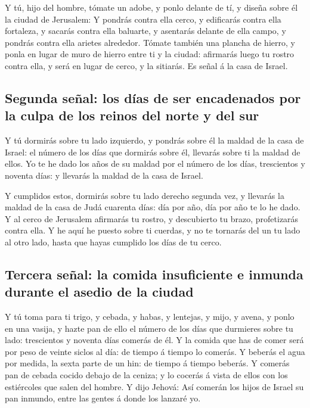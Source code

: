  Y tú, hijo del hombre, tómate un adobe, y ponlo delante de
tí, y diseña sobre él la ciudad de Jerusalem:  Y pondrás
contra ella cerco, y edificarás contra ella fortaleza, y sacarás contra
ella baluarte, y asentarás delante de ella campo, y pondrás contra ella
arietes alrededor.  Tómate también una plancha de hierro, y
ponla en lugar de muro de hierro entre ti y la ciudad: afirmarás luego
tu rostro contra ella, y será en lugar de cerco, y la sitiarás. Es señal
á la casa de Israel.

\hypertarget{segunda-seuxf1al-los-duxedas-de-ser-encadenados-por-la-culpa-de-los-reinos-del-norte-y-del-sur}{%
\subsection{Segunda señal: los días de ser encadenados por la culpa de
los reinos del norte y del
sur}\label{segunda-seuxf1al-los-duxedas-de-ser-encadenados-por-la-culpa-de-los-reinos-del-norte-y-del-sur}}

 Y tú dormirás sobre tu lado izquierdo, y pondrás sobre él
la maldad de la casa de Israel: el número de los días que dormirás sobre
él, llevarás sobre ti la maldad de ellos.  Yo te he dado los
años de su maldad por el número de los días, trescientos y noventa días:
y llevarás la maldad de la casa de Israel.

 Y cumplidos estos, dormirás sobre tu lado derecho segunda
vez, y llevarás la maldad de la casa de Judá cuarenta días: día por año,
día por año te lo he dado.  Y al cerco de Jerusalem
afirmarás tu rostro, y descubierto tu brazo, profetizarás contra ella.
 Y he aquí he puesto sobre ti cuerdas, y no te tornarás del
un tu lado al otro lado, hasta que hayas cumplido los días de tu cerco.

\hypertarget{tercera-seuxf1al-la-comida-insuficiente-e-inmunda-durante-el-asedio-de-la-ciudad}{%
\subsection{Tercera señal: la comida insuficiente e inmunda durante el
asedio de la
ciudad}\label{tercera-seuxf1al-la-comida-insuficiente-e-inmunda-durante-el-asedio-de-la-ciudad}}

 Y tú toma para ti trigo, y cebada, y habas, y lentejas, y
mijo, y avena, y ponlo en una vasija, y hazte pan de ello el número de
los días que durmieres sobre tu lado: trescientos y noventa días comerás
de él.  Y la comida que has de comer será por peso de
veinte siclos al día: de tiempo á tiempo lo comerás.  Y
beberás el agua por medida, la sexta parte de un hin: de tiempo á tiempo
beberás.  Y comerás pan de cebada cocido debajo de la
ceniza; y lo cocerás á vista de ellos con los estiércoles que salen del
hombre.  Y dijo Jehová: Así comerán los hijos de Israel su
pan inmundo, entre las gentes á donde los lanzaré yo.

